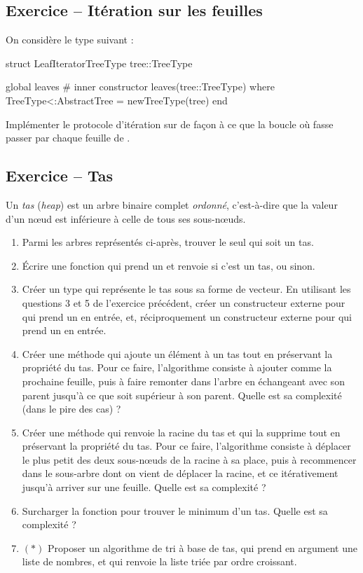 \documentclass{article}
\newcounter{loop}
\newcounter{numEx}
\newcommand{\exo}[1]{
	\stepcounter{numEx}
	\setcounter{loop}{0}
	\subsection*{Exercice \arabic{numEx} -- #1}
}
\newenvironment{repl}{\vspace{-0.6em}\VerbatimEnvironment\begin{jlrepl}}{\end{jlrepl}}
\begin{document}
\exo{Itération sur les feuilles}

On considère le type suivant :
\begin{repl}
	struct LeafIterator{TreeType}
		tree::TreeType
	
		global leaves  # inner constructor
		leaves(tree::TreeType) where {TreeType<:AbstractTree} = new{TreeType}(tree)
	end
\end{repl}

Implémenter le protocole d'itération sur  de façon à ce que la boucle  où  fasse passer  par chaque feuille de .

\exo{Tas}

Un \emph{tas} (\textit{heap}) est un arbre binaire complet \emph{ordonné}, c'est-à-dire que la valeur d'un nœud est inférieure à celle de tous ses sous-nœuds.

\begin{enumerate}
	\item Parmi les arbres représentés ci-après, trouver le seul qui soit un tas.
	
	\item Écrire une fonction  qui prend un  et renvoie  si c'est un tas, ou  sinon.
	
	\item Créer un type  qui représente le tas sous sa forme de vecteur. En utilisant les questions 3 et 5 de l'exercice précédent, créer un constructeur externe pour  qui prend un  en entrée, et, réciproquement un constructeur externe pour  qui prend un  en entrée.
	
	\item Créer une méthode  qui ajoute un élément  à un tas  tout en préservant la propriété du tas. Pour ce faire, l'algorithme consiste à ajouter  comme la prochaine feuille, puis à faire remonter  dans l'arbre en échangeant  avec son parent jusqu'à ce que  soit supérieur à son parent. Quelle est sa complexité (dans le pire des cas) ?
	
	\item Créer une méthode  qui renvoie la racine du tas et qui la supprime tout en préservant la propriété du tas. Pour ce faire, l'algorithme consiste à déplacer le plus petit des deux sous-nœuds de la racine à sa place, puis à recommencer dans le sous-arbre dont on vient de déplacer la racine, et ce itérativement jusqu'à arriver sur une feuille. Quelle est sa complexité ?
	
	\item Surcharger la fonction  pour trouver le minimum d'un tas. Quelle est sa complexité ?
	
	\item $(*)$ Proposer un algorithme de tri à base de tas, qui prend en argument une liste de nombres, et qui renvoie la liste triée par ordre croissant.
\end{enumerate}
\end{document}
